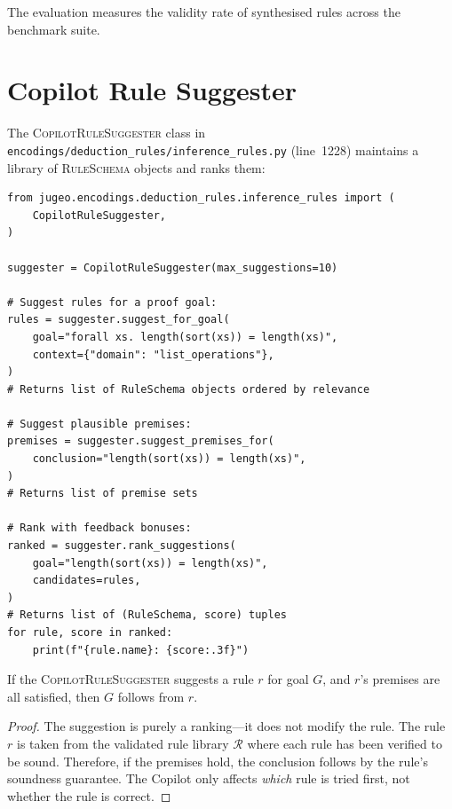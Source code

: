 \documentclass[11pt]{article}
\newcommand{\RuleSugg}{\textsc{CopilotRuleSuggester}}
\newcommand{\RuleSchema}{\textsc{RuleSchema}}
\newcommand{\rulelib}{\mathcal{R}}
\begin{document}
The evaluation measures the validity rate of synthesised rules across
the benchmark suite.

\section{Copilot Rule Suggester}\label{sec:rule-suggest}

The \RuleSugg{} class in
\texttt{encodings/deduction\_rules/inference\_rules.py} (line~1228)
maintains a library of \RuleSchema{} objects and ranks them:

\begin{lstlisting}[style=jugeo-python]
from jugeo.encodings.deduction_rules.inference_rules import (
    CopilotRuleSuggester,
)

suggester = CopilotRuleSuggester(max_suggestions=10)

# Suggest rules for a proof goal:
rules = suggester.suggest_for_goal(
    goal="forall xs. length(sort(xs)) = length(xs)",
    context={"domain": "list_operations"},
)
# Returns list of RuleSchema objects ordered by relevance

# Suggest plausible premises:
premises = suggester.suggest_premises_for(
    conclusion="length(sort(xs)) = length(xs)",
)
# Returns list of premise sets

# Rank with feedback bonuses:
ranked = suggester.rank_suggestions(
    goal="length(sort(xs)) = length(xs)",
    candidates=rules,
)
# Returns list of (RuleSchema, score) tuples
for rule, score in ranked:
    print(f"{rule.name}: {score:.3f}")
\end{lstlisting}

\begin{theorem}\label{thm:suggest-sound}
If the \RuleSugg{} suggests a rule $r$ for goal $G$, and $r$'s premises are
all satisfied, then $G$ follows from $r$.
\end{theorem}

\begin{proof}
The suggestion is purely a ranking---it does not modify the rule.  The rule
$r$ is taken from the validated rule library $\rulelib$ where each rule has
been verified to be sound.  Therefore, if the premises hold, the conclusion
follows by the rule's soundness guarantee.  The Copilot only affects
\emph{which} rule is tried first, not whether the rule is correct.
\end{proof}
\end{document}
